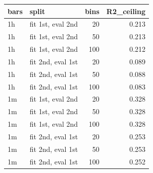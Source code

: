 \begin{tabular}{llrr}
\toprule
bars & split & bins & R2_ceiling \\
\midrule
1h & fit 1st, eval 2nd & 20 & 0.213 \\
1h & fit 1st, eval 2nd & 50 & 0.213 \\
1h & fit 1st, eval 2nd & 100 & 0.212 \\
1h & fit 2nd, eval 1st & 20 & 0.089 \\
1h & fit 2nd, eval 1st & 50 & 0.088 \\
1h & fit 2nd, eval 1st & 100 & 0.083 \\
1m & fit 1st, eval 2nd & 20 & 0.328 \\
1m & fit 1st, eval 2nd & 50 & 0.328 \\
1m & fit 1st, eval 2nd & 100 & 0.328 \\
1m & fit 2nd, eval 1st & 20 & 0.253 \\
1m & fit 2nd, eval 1st & 50 & 0.253 \\
1m & fit 2nd, eval 1st & 100 & 0.252 \\
\bottomrule
\end{tabular}
